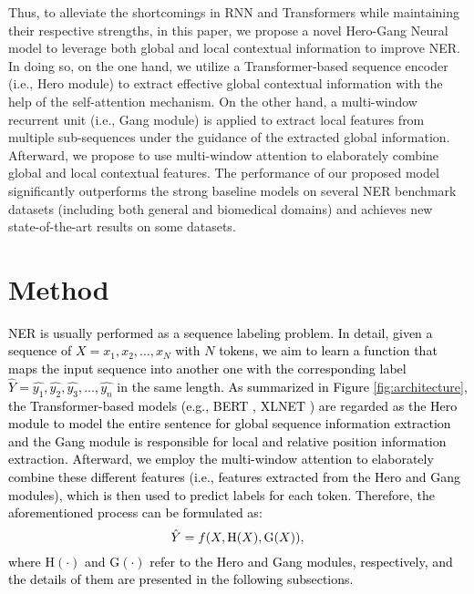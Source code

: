 \documentclass[11pt]{article}
\begin{document}
Thus, to alleviate the shortcomings in RNN and Transformers while maintaining their respective strengths, in this paper, we propose a novel Hero-Gang Neural model to leverage both global and local contextual information to improve NER.
In doing so, on the one hand, we utilize a Transformer-based sequence encoder (i.e., Hero module) to extract effective global contextual information with the help of the self-attention mechanism.
On the other hand, a multi-window recurrent unit (i.e., Gang module) is applied to extract local features from multiple sub-sequences under the guidance of the extracted global information.
Afterward, we propose to use multi-window attention to elaborately combine global and local contextual features.
The performance of our proposed model significantly outperforms the strong baseline models on several NER benchmark datasets (including both general and biomedical domains) and achieves new state-of-the-art results on some datasets.







\section{Method}
\textcolor{black}{
NER is usually performed as a sequence labeling problem.
In detail, given a sequence of $X =x_{1},x_{2},...,x_{N}$ with $N$ tokens, we aim to learn a function that maps the input sequence into another one with the corresponding label $\hat{Y}=\hat{y_{1}},\hat{y_{2}},\hat{y_{3}},...,\hat{y_{n}}$ in the same length.
As summarized in Figure \ref{fig:architecture}, the Transformer-based models (e.g., BERT \cite{BERT}, XLNET \cite{yangxlnet}) are regarded as the Hero module to model the entire sentence for global sequence information extraction and the Gang module is responsible for local and relative position information extraction.
Afterward, we employ the multi-window attention to elaborately combine these different features (i.e., features extracted from the Hero and Gang modules), which is then used to predict labels for each token. Therefore, the aforementioned process can be formulated as:
\begin{equation}
\setlength\abovedisplayskip{6pt}
\setlength\belowdisplayskip{6pt}
    \hat{Y} = f(X, \text{H}(X), \text{G}(X)),
\end{equation}
where $\text{H}(\cdot)$ and $\text{G}(\cdot)$ refer to the Hero and Gang modules, respectively, and the details of them are presented in the following subsections.
}
\end{document}
